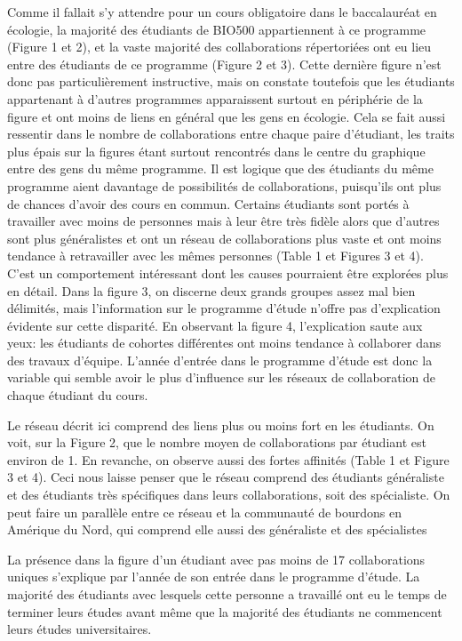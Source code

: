 \documentclass[letterpaper,twocolumn,showkeys, 12pt]{article}
\begin{document}
Comme il fallait s'y attendre pour un cours obligatoire dans le baccalauréat en écologie, la majorité des étudiants de BIO500 appartiennent à ce programme (Figure 1 et 2), et la vaste majorité des collaborations répertoriées ont eu lieu entre des étudiants de ce programme (Figure 2 et 3). Cette dernière figure n'est donc pas particulièrement instructive, mais on constate toutefois que les étudiants appartenant à d'autres programmes apparaissent surtout en périphérie de la figure et ont moins de liens en général que les gens en écologie. Cela se fait aussi ressentir dans le nombre de collaborations entre chaque paire d'étudiant, les traits plus épais sur la figures étant surtout rencontrés dans le centre du graphique entre des gens du même programme. Il est logique que des étudiants du même programme aient davantage de possibilités de collaborations, puisqu'ils ont plus de chances d'avoir des cours en commun. Certains étudiants sont portés à travailler avec moins de personnes mais à leur être très fidèle alors que d'autres sont plus généralistes et ont un réseau de collaborations plus vaste et ont moins tendance à retravailler avec les mêmes personnes (Table 1 et Figures 3 et 4). C'est un comportement intéressant dont les causes pourraient être explorées plus en détail.  Dans la figure 3, on discerne deux grands groupes assez mal bien délimités, mais l'information sur le programme d'étude n'offre pas d'explication évidente sur cette disparité. En observant la figure 4, l'explication saute aux yeux: les étudiants de cohortes différentes ont moins tendance à collaborer dans des travaux d'équipe. L'année d'entrée dans le programme d'étude est donc la variable qui semble avoir le plus d'influence sur les réseaux de collaboration de chaque étudiant du cours.

Le réseau décrit ici comprend des liens plus ou moins fort en les étudiants. On voit, sur la Figure 2, que le nombre moyen de collaborations par étudiant est environ de 1. En revanche, on observe aussi des fortes affinités (Table 1 et Figure 3 et 4). Ceci nous laisse penser que le réseau comprend des étudiants généraliste et des étudiants très spécifiques dans leurs collaborations, soit des spécialiste. On peut faire un parallèle entre ce réseau et la communauté de bourdons en Amérique du Nord, qui comprend elle aussi des généraliste et des spécialistes \cite{jacobson_decline_2018}

La présence dans la figure d'un étudiant avec pas moins de 17 collaborations uniques s'explique par l'année de son entrée dans le programme d'étude. La majorité des étudiants avec lesquels cette personne a travaillé ont eu le temps de terminer leurs études avant même que la majorité des étudiants ne commencent leurs études universitaires. 
\\
\\
\\
\\
\\
\\


\end{document}
